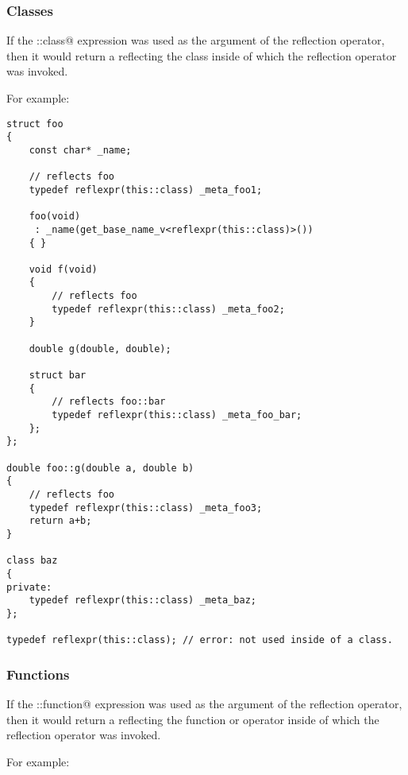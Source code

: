 \subsubsection{Classes}

If the \verb@this::class@ expression was used as the argument of the reflection
operator, then it would return a  reflecting the class
inside of which the reflection operator was invoked.

For example:

\begin{verbatim}
struct foo
{
	const char* _name;

	// reflects foo
	typedef reflexpr(this::class) _meta_foo1;

	foo(void)
	 : _name(get_base_name_v<reflexpr(this::class)>())
	{ }

	void f(void)
	{
		// reflects foo
		typedef reflexpr(this::class) _meta_foo2;
	}

	double g(double, double);

	struct bar
	{
		// reflects foo::bar
		typedef reflexpr(this::class) _meta_foo_bar;
	};
};

double foo::g(double a, double b)
{
	// reflects foo
	typedef reflexpr(this::class) _meta_foo3;
	return a+b;
}

class baz
{
private:
	typedef reflexpr(this::class) _meta_baz;
};

typedef reflexpr(this::class); // error: not used inside of a class.

\end{verbatim}

\subsubsection{Functions}

If the \verb@this::function@ expression was used as the argument of the reflection
operator, then it would return a  reflecting the function or operator
inside of which the reflection operator was invoked.

For example:

